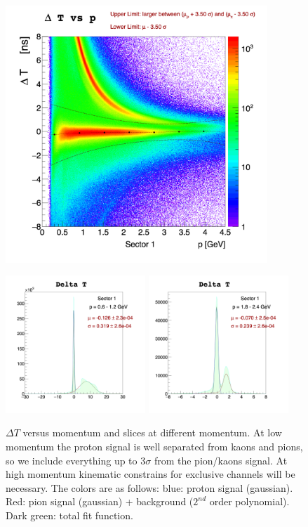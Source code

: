 \begin{figure}[ht]
  \centering
		\includegraphics[width=0.88\textwidth ]{img/dist-dtfit_sector-1.png}
		
		\includegraphics[width=0.47\textwidth]{img/slice-2_sector-1.png}
		\includegraphics[width=0.47\textwidth]{img/slice-4_sector-1.png}
		
		\caption{$\Delta T$ versus momentum and slices at different momentum.
					At low momentum the proton signal is well separated
					from kaons and pions, so we include everything up to
					$3\sigma$ from the pion/kaons signal. At high momentum 
					kinematic constrains for exclusive channels will be necessary.
					The colors are as follows: blue: proton signal (gaussian).
					Red: pion signal (gaussian) + background ($2^{nd}$ order 
					polynomial). Dark green: total fit function.}
 		\label{fig:dt_vs_mom}
\end{figure}



